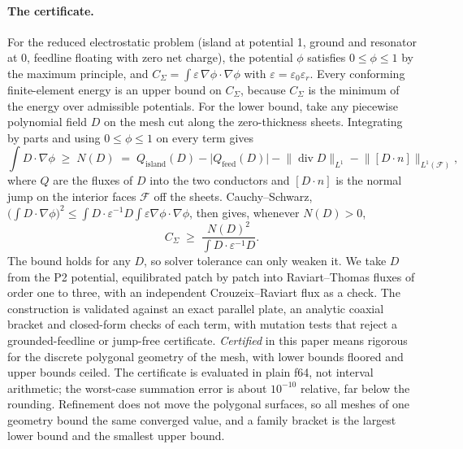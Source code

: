 \documentclass{anvil-paper}
\begin{document}
\paragraph{The certificate.}
For the reduced electrostatic problem (island at potential 1, ground and
resonator at 0, feedline floating with zero net charge), the potential
$\phi$ satisfies $0 \le \phi \le 1$ by the maximum principle, and
$C_\Sigma = \int \varepsilon\,\nabla\phi\cdot\nabla\phi$ with $\varepsilon
= \varepsilon_0\varepsilon_r$. Every conforming finite-element energy is an
upper bound on $C_\Sigma$, because $C_\Sigma$ is the minimum of the energy
over admissible potentials. For the lower bound, take any piecewise
polynomial field $D$ on the mesh cut along the zero-thickness sheets.
Integrating by parts and using $0\le\phi\le1$ on every term gives
\begin{equation}
  \int D\cdot\nabla\phi \;\ge\; N(D) \;=\; Q_{\mathrm{island}}(D)
  - \lvert Q_{\mathrm{feed}}(D)\rvert
  - \lVert \operatorname{div} D\rVert_{L^1}
  - \lVert [D\cdot n]\rVert_{L^1(\mathcal F)},
  \label{eq:cert-n}
\end{equation}
where $Q$ are the fluxes of $D$ into the two conductors and
$[D\cdot n]$ is the normal jump on the interior faces $\mathcal F$ off
the sheets. Cauchy--Schwarz, $\bigl(\int D\cdot\nabla\phi\bigr)^2 \le
\int D\cdot\varepsilon^{-1}D \int\varepsilon\nabla\phi\cdot\nabla\phi$,
then gives, whenever $N(D) > 0$,
\begin{equation}
  C_\Sigma \;\ge\; \frac{N(D)^2}{\int D\cdot\varepsilon^{-1}D}.
  \label{eq:cert}
\end{equation}
The bound holds for any $D$, so solver tolerance can only weaken it. We
take $D$ from the P2 potential, equilibrated patch by patch into
Raviart--Thomas fluxes of order one to three, with an independent
Crouzeix--Raviart flux as a check. The construction is validated against
an exact parallel plate, an analytic coaxial bracket and closed-form
checks of each term, with mutation tests that reject a grounded-feedline
or jump-free certificate. \emph{Certified} in this paper means rigorous
for the discrete polygonal geometry of the mesh, with lower bounds
floored and upper bounds ceiled. The certificate is evaluated in plain
f64, not interval arithmetic; the worst-case summation error is about
$10^{-10}$ relative, far below the rounding. Refinement does not move the
polygonal surfaces, so all meshes of one geometry bound the same
converged value, and a family bracket is the largest lower bound and the
smallest upper bound.
\end{document}

